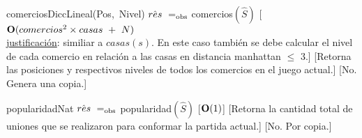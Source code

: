\begin{Interfaz}
    \InterfazFuncion
    {comercios}{}{DiccLineal(Pos,\ Nivel)}
    {$\hat{res}\ \igobs\ $comercios$(\hat{S})$}
    [$\bold{O}(comercios^{2} \times casas\ +\ N)$
    \\ \underline{justificación}: similiar a $casas(s)$. En este caso también se debe calcular el nivel de cada comercio en relación a las casas en distancia manhattan $\leq$ 3.]%
    [Retorna las posiciones y respectivos niveles de todos los comercios en el juego actual.]
    [No. Genera una copia.]

    \InterfazFuncion
    {popularidad}{}{Nat}
    {$\hat{res}\ \igobs\ $popularidad$(\hat{S})$}
    [$\bold{O}(1)$]
    [Retorna la cantidad total de uniones que se realizaron para conformar la partida actual.]
    [No. Por copia.]


\end{Interfaz}
